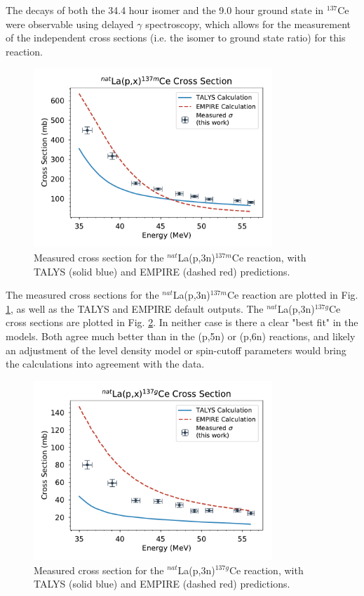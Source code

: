 \documentclass[aps,twocolumn,secnumarabic,balancelastpage,amsmath,amssymb,nofootinbib,floatfix]{revtex4-1}
\begin{document}
The decays of both the 34.4 hour isomer and the 9.0 hour ground state in $^{137}$Ce were observable using delayed $\gamma$ spectroscopy, which allows for the measurement of the independent cross sections (i.e. the isomer to ground state ratio) for this reaction.  

\begin{figure}[htb]
\includegraphics[width=9cm]{cross_sections/137CEm}
\caption{Measured cross section for the $^{nat}$La(p,3n)$^{137m}$Ce reaction, with TALYS (solid blue) and EMPIRE (dashed red) predictions.
}
\label{fig:137CEm}
\end{figure}

The measured cross sections for the $^{nat}$La(p,3n)$^{137m}$Ce reaction are plotted in Fig. \ref{fig:137CEm}, as well as the TALYS and EMPIRE default outputs.  The $^{nat}$La(p,3n)$^{137g}$Ce cross sections are plotted in Fig. \ref{fig:137CEg}.  In neither case is there a clear "best fit" in the models.  Both agree much better than in the (p,5n) or (p,6n) reactions, and likely an adjustment of the level density model or spin-cutoff parameters would bring the calculations into agreement with the data.

\begin{figure}[htb]
\includegraphics[width=9cm]{cross_sections/137CEg}
\caption{Measured cross section for the $^{nat}$La(p,3n)$^{137g}$Ce reaction, with TALYS (solid blue) and EMPIRE (dashed red) predictions.
}
\label{fig:137CEg}
\end{figure}
\end{document}

